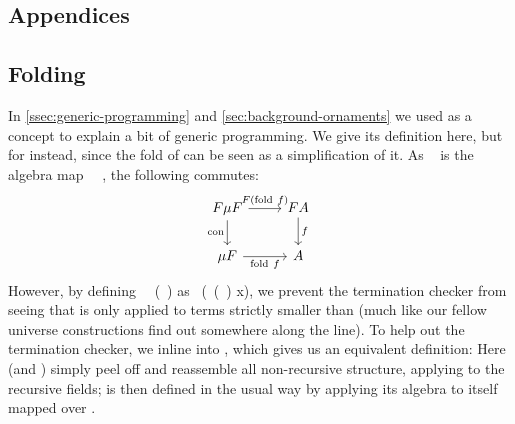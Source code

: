 
\newpage
\begin{appendix}
\section*{Appendices}
\renewcommand{\thesubsection}{\Alph{subsection}}

\subsection{Folding}\label{app:gfold}
In \autoref{ssec:generic-programming} and \autoref{sec:background-ornaments} we used  as a concept to explain a bit of generic programming. We give its definition here, but for  instead, since the fold of  can be seen as a simplification of it.
As \  is the algebra map \ \ , the following commutes:
\[\begin{tikzcd}
	{F\mu F} & FA \\
	{\mu F} & A
	\arrow["f", from=1-2, to=2-2]
	\arrow["{\mathrm{fold}\ f}"', from=2-1, to=2-2]
	\arrow["{F(\mathrm{fold}\ f)}", from=1-1, to=1-2]
	\arrow["{\mathrm{con}}"', from=1-1, to=2-1]
\end{tikzcd}\]
However, by defining \ \ (\ ) as \ (\ (\ ) x), we prevent the termination checker from seeing that  is only applied to terms strictly smaller than  (much like our fellow universe constructions find out somewhere along the line). To help out the termination checker, we inline  into , which gives us an equivalent definition:
Here  (and ) simply peel off and reassemble all non-recursive structure, applying  to the recursive fields;  is then defined in the usual way by applying its algebra  to itself mapped over .


\end{appendix}
